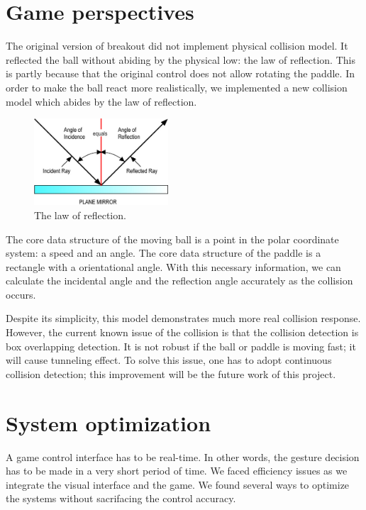 \documentclass[10pt,twocolumn,letterpaper]{article}
\begin{document}
\section{Game perspectives}
The original version of breakout did not implement physical collision model. 
It reflected the ball without abiding by the physical low: the law of reflection. 
This is partly because that the original control does not allow rotating the paddle. 
In order to make the ball react more realistically, we implemented a new collision 
model which abides by the law of reflection.
\begin{figure}[h]
\centering
\includegraphics[width=5cm]{law_of_reflection.png}
\caption{The law of reflection.}
\label{fig:reflection}
\end{figure}

The core data structure of the moving ball is a point in the polar coordinate system: 
a speed and an angle. The core data structure of the paddle is a rectangle with a orientational 
angle. With this necessary information, we can calculate the incidental angle and the 
reflection angle accurately as the collision occurs.

Despite its simplicity, this model demonstrates much more real collision response. 
However, the current known issue of the collision is that the collision detection is 
box overlapping detection. It is not robust if the ball or paddle is moving fast; 
it will cause tunneling effect. To solve this issue, one has to adopt continuous 
collision detection; this improvement will be the future work of this project.

\section{System optimization}
A game control interface has to be real-time. In other words, 
the gesture decision has to be made in a very short period of time. 
We faced efficiency issues as we integrate the visual interface and 
the game. We found several ways to optimize the systems without 
sacrifacing the control accuracy.
\end{document}
